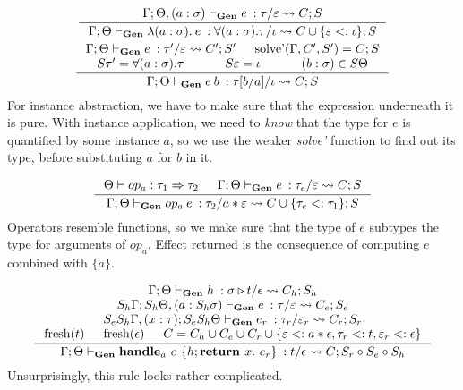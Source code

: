\documentclass[declaration,shortabstract]{iithesis}
\theoremstyle{definition} \newtheorem{definition}{Definition}[section]
\newcommand{\gens}[6][\Gamma;\Theta]{\ensuremath{{{#1} \vdash_\textbf{Gen} {#2} \: : {#3}/{#4}} \rightsquigarrow {#5};{#6}}}
\newcommand{\lam}[1][x]{\ensuremath{\lambda #1.\:}}
\newcommand{\fresh}[1]{\ensuremath{\operatorname{fresh}({#1})}}
\begin{document}
\begin{gather*}
\inference{
    \gens[\Gamma; \Theta, (a : \sigma)]{e}{\tau}{\varepsilon}{C}{S} \\
}{
    \gens{\lam[(a : \sigma)] e}{\forall (a : \sigma) . \tau}{\iota}{
        C \cup \{ \varepsilon <: \iota \}   
    }{S}
}
\\
\inference{
    \gens{e}{\tau'}{\varepsilon}{C'}{S'} &
    \operatorname{solve'}(\Gamma, C', S') = C; S  \\
    S \tau' = \forall (a : \sigma) . \tau &
    S \varepsilon = \iota &
    (b:\sigma) \in S\Theta
}{
    \gens{e\:b}{\tau[b/a]}{\iota}{C}{S}
}
\end{gather*}
For instance abstraction, we have to make sure that the expression underneath it is pure.
With instance application, we need to \textit{know} that the type for $e$ is quantified by some instance $a$,
so we use the weaker \textit{solve'} function to find out its type, before substituting $a$ for $b$ in it.

\begin{gather*}
\inference{
    \Theta \vdash op_a : \tau_1 \Rightarrow \tau_2 &
    \gens{e}{\tau_e}{\varepsilon}{C}{S}
}{
    \gens{op_a \: e}{\tau_2}{a * \varepsilon}{C \cup \{\tau_e <: \tau_1 \}}{S}
}
\end{gather*}
Operators resemble functions, so we make sure that the type of $e$ subtypes the type for arguments of $op_a$.
Effect returned is the consequence of computing $e$ combined with $\{a\}$.

\begin{gather*}
\begin{gathered}
\inference{
\gens{h}{\sigma \triangleright t}{\epsilon}{C_h}{S_h} \\
\gens[S_h\Gamma; S_h\Theta, (a:S_h\sigma)]{e}{\tau}{\varepsilon}{C_e}{S_e} \\
\gens[S_e S_h \Gamma,(x:\tau); S_e S_h \Theta]{e_r}{\tau_r}{\varepsilon_r}{C_r}{S_r} \\
\fresh{t} & \fresh{\epsilon} &
C = C_h \cup C_e \cup C_r \cup\{\varepsilon <: a * \epsilon, \tau_r <: t, \varepsilon_r <: \epsilon \}
}{
\gens{\textbf{handle}_a \ e\ \{h;\textbf{return } x.\ e_r\}}{t}{\epsilon}{C}{S_r \circ S_e \circ S_h}
}
\end{gathered}
\end{gather*}
Unsurprisingly, this rule looks rather complicated.
\end{document}
